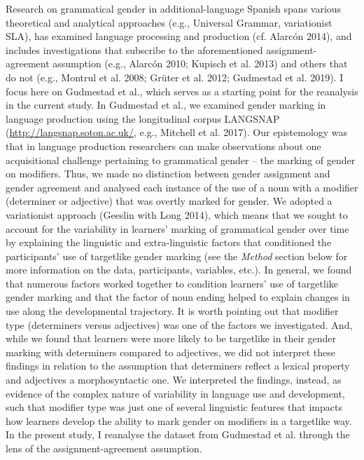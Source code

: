 \documentclass[12pt]{article}
\newenvironment{styleNoSpacing}{\setlength\leftskip{0cm}\setlength\rightskip{0cm plus 1fil}\setlength\parindent{0cm}\setlength\parfillskip{0pt plus 1fil}\setlength\parskip{0cm plus 1pt}\writerlistparindent\writerlistleftskip\leavevmode\normalfont\normalsize\fontsize{11pt}{13.2pt}\selectfont\writerlistlabel\ignorespaces}{\unskip\vspace{0cm plus 1pt}\par}
\newcommand\writerlistleftskip{}
\newcommand\writerlistparindent{}
\newcommand\writerlistlabel{}
\begin{document}
\begin{styleNoSpacing}
Research on grammatical gender in additional-language Spanish spans various theoretical and analytical approaches (e.g., Universal Grammar, variationist SLA), has examined language processing and production (cf. Alarcón 2014), and includes investigations that subscribe to the aforementioned assignment-agreement assumption (e.g., Alarcón 2010; Kupisch et al. 2013) and others that do not (e.g., Montrul et al. 2008; Grüter et al. 2012; Gudmestad et al. 2019). I focus here on Gudmestad et al., which serves as a starting point for the reanalysis in the current study. In Gudmestad et al., we examined gender marking in language production using the longitudinal corpus LANGSNAP (\url{http://langsnap.soton.ac.uk/}, e.g., Mitchell et al. 2017). Our epistemology was that in language production researchers can make observations about one acquisitional challenge pertaining to grammatical gender – the marking of gender on modifiers. Thus, we made no distinction between gender assignment and gender agreement and analysed each instance of the use of a noun with a modifier (determiner or adjective) that was overtly marked for gender. We adopted a variationist approach (Geeslin with Long 2014), which means that we sought to account for the variability in learners’ marking of grammatical gender over time by explaining the linguistic and extra-linguistic factors that conditioned the participants’ use of targetlike gender marking (see the \textit{Method} section below for more information on the data, participants, variables, etc.). In general, we found that numerous factors worked together to condition learners’ use of targetlike gender marking and that the factor of noun ending helped to explain changes in use along the developmental trajectory. It is worth pointing out that modifier type (determiners versus adjectives) was one of the factors we investigated. And, while we found that learners were more likely to be targetlike in their gender marking with determiners compared to adjectives, we did not interpret these findings in relation to the assumption that determiners reflect a lexical property and adjectives a morphosyntactic one. We interpreted the findings, instead, as evidence of the complex nature of variability in language use and development, such that modifier type was just one of several linguistic features that impacts how learners develop the ability to mark gender on modifiers in a targetlike way. In the present study, I reanalyse the dataset from Gudmestad et al. through the lens of the assignment-agreement assumption.
\end{styleNoSpacing}
\end{document}
